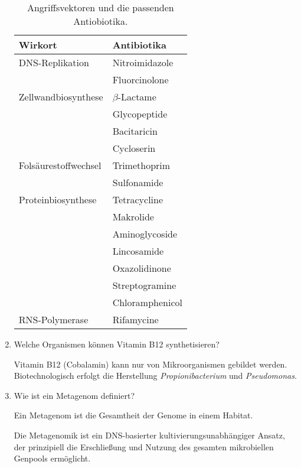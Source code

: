 \begin{enumerate}
		\begin{table}[ht!]
		\begin{center}
			\begin{tabular}{p{4cm} p{3cm}} 
		\toprule
			Wirkort	&	Antibiotika \\
			\midrule
			DNS-Replikation		&	Nitroimidazole \\
										&	Fluorcinolone 	\\
			Zellwandbiosynthese	&	\begin{math}\beta\end{math}-Lactame \\
			\multirow{3}{*}{}		&	Glycopeptide 	\\
										&	Bacitaricin 	\\
										&	Cycloserin 		\\
			Folsäurestoffwechsel	&	Trimethoprim	\\
										&	Sulfonamide 	\\
			Proteinbiosynthese	&	Tetracycline \\
			\multirow{5}{*}{}		&	Makrolide 	\\
										&	Aminoglycoside 	\\
										&	Lincosamide 	\\
										&	Oxazolidinone 	\\
										&	Streptogramine 	\\
										&	Chloramphenicol 	\\
			RNS-Polymerase			&	Rifamycine \\
		\bottomrule
		\end{tabular}
		\caption{Angriffsvektoren und die passenden Antiobiotika.}
		\label{tab:wirkorteantibiose}
		\end{center}
		\end{table}

	\item Welche Organismen können Vitamin B12 synthetisieren?

		Vitamin B12 (Cobalamin) kann nur von Mikroorganismen gebildet werden.
		Biotechnologisch erfolgt die Herstellung \emph{Propionibacterium} und \emph{Pseudomonas}.
	
	\item Wie ist ein Metagenom definiert?

		Ein Metagenom ist die Gesamtheit der Genome in einem Habitat.
		
		Die Metagenomik ist ein DNS-basierter kultivierungsunabhängiger Ansatz,
		der prinzipiell die Erschließung und Nutzung des gesamten mikrobiellen Genpools ermöglicht.


\end{enumerate}
